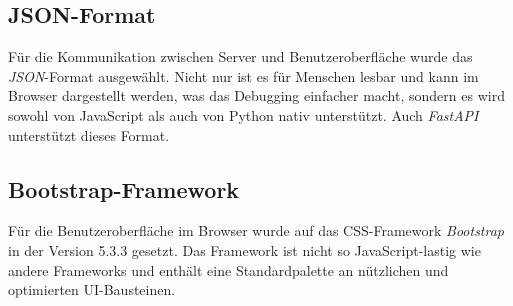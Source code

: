 \subsection{JSON-Format}

Für die Kommunikation zwischen Server und Benutzeroberfläche wurde das \textit{JSON}-Format ausgewählt. Nicht nur ist es für Menschen lesbar und kann im Browser dargestellt werden,
was das Debugging einfacher macht, sondern es wird sowohl von JavaScript als auch von Python nativ unterstützt. Auch \textit{FastAPI} unterstützt dieses Format.

\subsection{Bootstrap-Framework}

Für die Benutzeroberfläche im Browser wurde auf das CSS-Framework \textit{Bootstrap}~\cite{bootstrap} in der Version 5.3.3 gesetzt. Das Framework ist nicht so JavaScript-lastig
wie andere Frameworks und enthält eine Standardpalette an nützlichen und optimierten UI-Bausteinen. 
